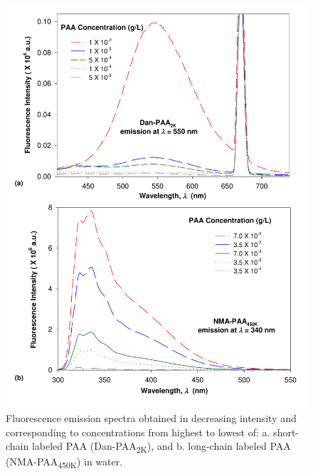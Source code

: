 \documentclass[journal=mamobx,manuscript=article]{achemso}
\begin{document}
\begin{figure}[H]
\includegraphics[scale=0.65]{Fig4.pdf}
\caption{Fluorescence emission spectra obtained in
decreasing intensity and corresponding to concentrations from highest to lowest of: a. short-chain labeled PAA (Dan-PAA\textsubscript{2K}), and b. long-chain labeled PAA (NMA-PAA\textsubscript{450K}) in water.}
\label{figure 2}
\end{figure}
 
\end{document}
